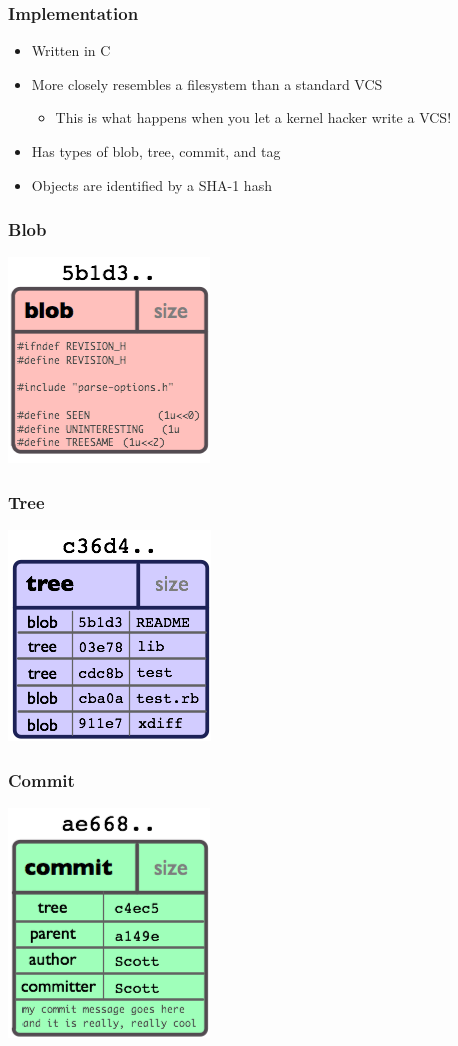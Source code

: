 \documentclass{beamer}
\begin{document}
\begin{frame}
    \frametitle{Implementation}
    \begin{itemize}
	\item Written in C
	\item More closely resembles a filesystem than a standard VCS
	\begin{itemize}
	    \item This is what happens when you let a kernel hacker write a VCS!
	\end{itemize}
	\item Has types of blob, tree, commit, and tag
	\item Objects are identified by a SHA-1 hash
    \end{itemize}
\end{frame}

\begin{frame}
    \frametitle{Blob}
    \includegraphics{images/object-blob.png}
\end{frame}

\begin{frame}
    \frametitle{Tree}
    \includegraphics{images/object-tree.png}
\end{frame}

\begin{frame}
    \frametitle{Commit}
    \includegraphics{images/object-commit.png}
\end{frame}
\end{document}
